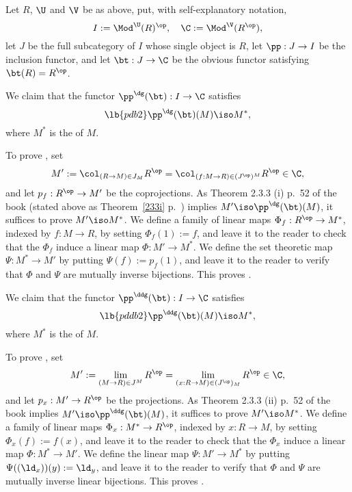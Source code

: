 \documentclass[12pt]{article}
\theoremstyle{remark}
\theoremstyle{definition}
\begin{document}
Let $R$, $\U$ and $\V$ be as above, put, with self-explanatory notation, 
$$
I:=\Mod^\U(R)^{\op},\quad\C:=\Mod^\V(R^{\op}),
$$ 
let $J$ be the full subcategory of $I$ whose single object is $R$, let $\pp:J\to I$ be the inclusion functor, and let $\bt:J\to\C$ be the obvious functor satisfying $\bt(R)=R^{\op}$. 

We claim that the functor $\pp^\dg(\bt):I\to\C$ satisfies 
\begin{equation}\lb{pdb2}
\pp^\dg(\bt)(M)\iso M^*,
\end{equation} 
where $M^*$ is the  of $M$. 

To prove , set 
$$
M':=\col_{(R\to M)\in J_M}R^{\op}=\col_{(f:M\to R)\in(J^{\op})^M}R^{\op}\in\C, 
$$ 
and let $p_f:R^{\op}\to M'$ be the coprojections. As Theorem 2.3.3 (i) p.~52 of the book (stated above as Theorem~\ref{233i} p.~) implies $M'\iso\pp^\dg(\bt)(M)$, it suffices to prove $M'\iso M^*$. We define a family of linear maps $\Phi_f:R^{\op}\to M^*$, indexed by $f:M\to R$, by setting $\Phi_f(1):=f$, and leave it to the reader to check that the $\Phi_f$ induce a linear map $\Phi:M'\to M^*$. We define the set theoretic map $\Psi:M^*\to M'$ by putting $\Psi(f):=p_f(1)$, and leave it to the reader to verify that $\Phi$ and $\Psi$ are mutually inverse bijections. This proves . 

We claim that the functor $\pp^\ddg(\bt):I\to\C$ satisfies 
\begin{equation}\lb{pddb2}
\pp^\ddg(\bt)(M)\iso M^*, 
\end{equation} 
where $M^*$ is the  of $M$. 

To prove , set 
$$
M':=\lim_{(M\to R)\in J^M}R^{\op}=\lim_{(x:R\to M)\in(J^{\op})_M}R^{\op}\in\C, 
$$ 
and let $p_x:M'\to R^{\op}$ be the projections. As Theorem 2.3.3 (ii) p.~52 of the book implies $M'\iso\pp^\ddg(\bt)(M)$, it suffices to prove $M'\iso M^*$. We define a family of linear maps $\Phi_x:M^*\to R^{\op}$, indexed by $x:R\to M$, by setting $\Phi_x(f):=f(x)$, and leave it to the reader to check that the $\Phi_x$ induce a linear map $\Phi:M^*\to M'$. We define the linear map $\Psi:M'\to M^*$ by putting $\Psi((\ld_x))(y):=\ld_y$, and leave it to the reader to verify that $\Phi$ and $\Psi$ are mutually inverse linear bijections. This proves . 


\end{document}
